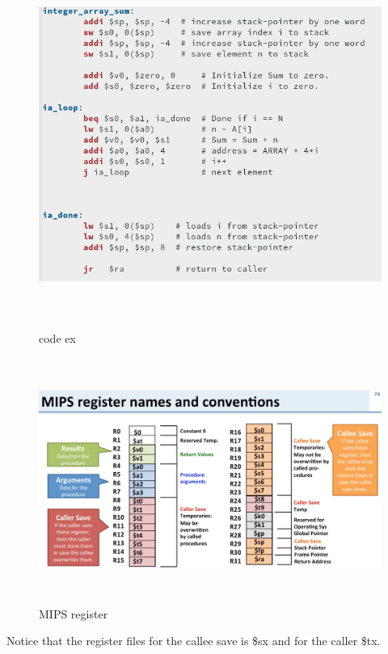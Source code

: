 \begin{figure}[h]
    \vspace{10mm}
    \centering
    \includegraphics[width=16cm, height=12cm]{image/code-ex.png} 
    \caption{code ex}
\end{figure}

\begin{figure}[h]
    \vspace{10mm}
    \centering
    \includegraphics[width=16cm, height=8cm]{image/mips-register.png} 
    \caption{MIPS register}
\end{figure}

Notice that the register files for the callee save is \$sx and for the caller \$tx.

